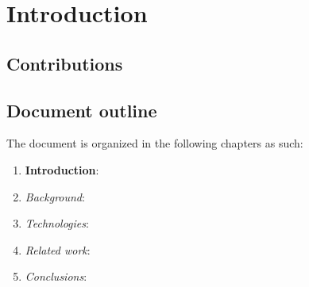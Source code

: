 
\chapter{Introduction}\label{chapter:introduction}

	\section{Contributions}\label{sec:contributions}
	
	\section{Document outline}\label{sec:document_outline}
	
	
		The document is organized in the following chapters as such:
		
		\begin{enumerate}
			
			\item \textbf{Introduction}:
			\item \textit{Background}:
			\item \textit{Technologies}:
			\item \textit{Related work}:
			\item \textit{Conclusions}:
			
		\end{enumerate}